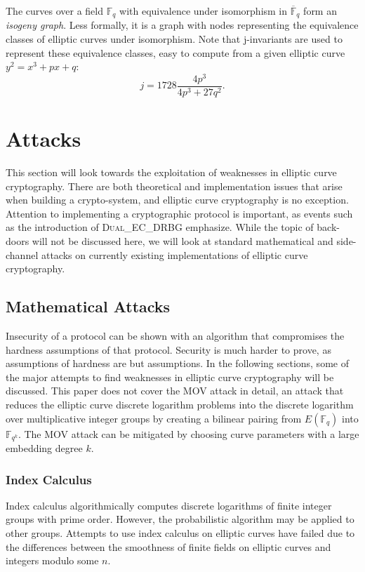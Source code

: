 \documentclass{article}
\begin{document}
    The curves over a field $\mathbb{F}_{q}$ with equivalence under isomorphism
    in $\overline{\mathbb{F}}_{q}$ form an \textit{isogeny graph}. Less
    formally, it is a graph with nodes representing the equivalence classes of
    elliptic curves under isomorphism.  Note that j-invariants are used to
    represent these equivalence classes, easy to compute from a given elliptic
    curve $y^2 = x^3 + px + q$:
    \begin{equation}
        j = 1728 \frac{4p^3}{4p^3 + 27q^2}.
    \end{equation}

\section{Attacks}
    This section will look towards the exploitation of weaknesses in elliptic
    curve cryptography. There are both theoretical and implementation issues
    that arise when building a crypto-system, and elliptic curve cryptography
    is no exception.  Attention to implementing a cryptographic protocol is
    important, as events such as the introduction of \textsc{Dual\_EC\_DRBG}
    emphasize. While the topic of back-doors will not be discussed here, we
    will look at standard mathematical and side-channel attacks on currently
    existing implementations of elliptic curve cryptography.
    
\subsection{Mathematical Attacks}
    Insecurity of a protocol can be shown with an algorithm that compromises
    the hardness assumptions of that protocol. Security is much harder to
    prove, as assumptions of hardness are but assumptions. In the following
    sections, some of the major attempts to find weaknesses in elliptic curve
    cryptography will be discussed. This paper does not cover the MOV attack in
    detail, an attack that reduces the elliptic curve discrete logarithm
    problems into the discrete logarithm over multiplicative integer groups by
    creating a bilinear pairing from $E(\mathbb{F}_q)$ into $\mathbb{F}_{q^k}$.
    The MOV attack can be mitigated by choosing curve parameters with a large
    embedding degree $k$.

\subsubsection{Index Calculus}
    Index calculus algorithmically computes discrete logarithms of finite
    integer groups with prime order. However, the probabilistic algorithm may
    be applied to other groups. Attempts to use index calculus on elliptic
    curves have failed due to the differences between the smoothness of finite
    fields on elliptic curves and integers modulo some $n$.
\end{document}
